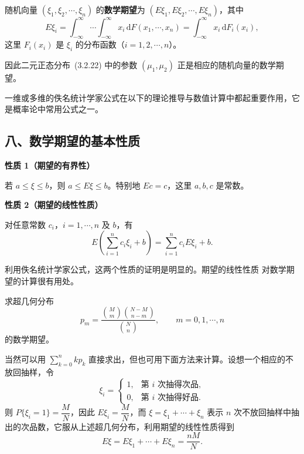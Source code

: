 \documentclass[../../main.tex]{subfiles}
\begin{document}
\begin{definition}[随机向量的数学期望]\label{definition:ch04-随机向量期望}
随机向量 $(\xi_1,\xi_2,\cdots,\xi_n)$ 的\textbf{数学期望}为 $(E\xi_1,E\xi_2,\cdots,E\xi_n)$，其中
\[
E\xi_i=\int_{-\infty}^{\infty}\cdots\int_{-\infty}^{\infty}x_i\,\mathrm{d}F(x_1,\cdots,x_n)
=\int_{-\infty}^{\infty}x_i\,\mathrm{d}F_i(x_i),
\]
这里 $F_i(x_i)$ 是 $\xi_i$ 的分布函数（$i=1,2,\cdots,n$）。
\end{definition}

因此二元正态分布~(3.2.22) 中的参数 $(\mu_1,\mu_2)$ 正是相应的随机向量的数学期望。

一维或多维的佚名统计学家公式在以下的理论推导与数值计算中都起重要作用，它是概率论中常用公式之一。

\subsection*{八、数学期望的基本性质}

\noindent\textbf{性质 1（期望的有界性）}\par
若 $a\leqslant\xi\leqslant b$，则 $a\leqslant E\xi\leqslant b$。特别地 $Ec=c$，这里 $a,b,c$ 是常数。


\noindent\textbf{性质 2（期望的线性性质）}\par
对任意常数 $c_i$，$i=1,\cdots,n$ 及 $b$，有
\[
E\left(\sum_{i=1}^n c_i\xi_i+b\right)=\sum_{i=1}^n c_i E\xi_i+b.
\]


利用佚名统计学家公式，这两个性质的证明是明显的。期望的线性性质 对数学期望的计算很有用处。

\begin{example}[超几何分布的期望]\label{example:ch04-超几何期望}
求超几何分布
\[
p_m=\frac{\binom{M}{m}\binom{N-M}{n-m}}{\binom{N}{n}},\qquad m=0,1,\cdots,n
\]
的数学期望。
\end{example}

当然可以用 $\sum_{k=0}^n kp_k$ 直接求出，但也可用下面方法来计算。设想一个相应的不放回抽样，令
\[
\xi_i=\begin{cases}
1,&\text{第 }i\text{ 次抽得次品},\\
0,&\text{第 }i\text{ 次抽得好品}.
\end{cases}
\]
则 $P\{\xi_i=1\}=\dfrac{M}{N}$，因此 $E\xi_i=\dfrac{M}{N}$，而 $\xi=\xi_1+\cdots+\xi_n$ 表示 $n$ 次不放回抽样中抽出的次品数，它服从上述超几何分布，利用期望的线性性质得到
\[
E\xi=E\xi_1+\cdots+E\xi_n=\frac{nM}{N}.
\]
\end{document}
